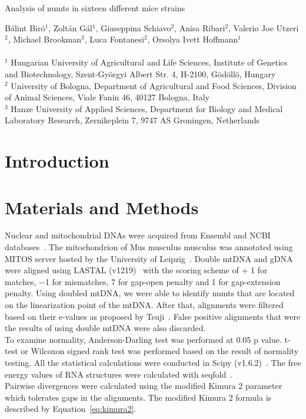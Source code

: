 \documentclass[a4paper,12pt]{article}
\numberwithin{equation}{section} %
\begin{document}
\begin{center}
	\Large{Analysis of numts in sixteen different mice strains}
\end{center}
\small{Bálint Biró$^1$, Zoltán Gál$^1$, Giuseppina Schiavo$^2$, Anisa Ribari$^2$, Valerio Joe Utzeri$^2$, Michael Brookman$^3$, Luca Fontanesi$^2$, Orsolya Ivett Hoffmann$^1$}\\ \\
\scriptsize{$^1$ Hungarian University of Agricultural and Life Sciences, Institute of Genetics and Biotechnology, Szent-Györgyi Albert Str. 4, H-2100, Gödöllö, Hungary\\
$^2$ University of Bologna, Department of Agricultural and Food Sciences, Division of Animal Sciences, Viale Fanin 46, 40127 Bologna, Italy\\
$^3$ Hanze University of Applied Sciences, Department for Biology and Medical Laboratory Research, Zernikeplein 7, 9747 AS Groningen, Netherlands}

\section{Introduction}

\section{Materials and Methods}
\normalsize
\indent Nuclear and mitochondrial DNAs were acquired from Ensembl and NCBI databases~. The mitochondrion of Mus musculus musculus was annotated using MITOS server hosted by the University of Leipzig~. Double mtDNA and gDNA were aligned using LASTAL (v1219)~ with the scoring scheme of + 1 for matches, −1 for mismatches, 7 for gap-open penalty and 1 for gap-extension penalty. Using doubled mtDNA, we were able to identify numts that are located on the linearization point of the mtDNA. After that, alignments were filtered based on their e-values as proposed by Tsuji~.  False positive alignments that were the results of using double mtDNA were also discarded.\\ \indent To examine normality, Anderson-Darling test was performed at 0.05 p value. t-test or Wilcoxon signed rank test was performed based on the result of normality testing. All the statistical calculations were conducted in Scipy (v1.6.2)~. The free energy values of RNA structures were calculated with seqfold~. \\ Pairwise divergences were calculated using the modified Kimura 2 parameter~ which tolerates gaps in the alignments. The modified Kimura 2 formula is described by Equation~\ref{eq:kimura2}.
\end{document}
